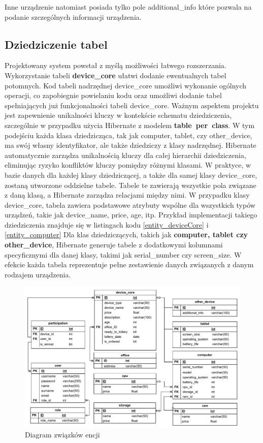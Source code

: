 Inne urządzenie natomiast posiada tylko pole additional\_info które pozwala na podanie szczególnych informacji urządzenia.

\subsection{Dziedziczenie tabel}
\label{dzedziczenie_hibernate:label}
Projektowany system powstał z myślą możliwości łatwego rozszerzania. Wykorzystanie tabeli \textbf{device\_core} ułatwi dodanie ewentualnych tabel potomnych. Kod tabeli nadrzędnej device\_core umożliwi wykonanie ogólnych operacji, co zapobiegnie powielaniu kodu oraz umożliwi dodanie tabel spełniających już funkcjonalności tabeli device\_core. Ważnym aspektem projektu jest zapewnienie unikalności kluczy w kontekście schematu dziedziczenia, szczególnie w przypadku użycia Hibernate z modelem \textbf{table~per~class}. W tym podejściu każda klasa dziedzicząca, tak jak computer, tablet, czy other\_device, ma swój własny identyfikator, ale także dziedziczy z klasy nadrzędnej. Hibernate automatycznie zarządza unikalnością kluczy dla całej hierarchii dziedziczenia, eliminując ryzyko konfliktów kluczy pomiędzy różnymi klasami. W praktyce, w bazie danych dla każdej klasy dziedziczącej, a także dla samej klasy device\_core, zostaną utworzone oddzielne tabele. Tabele te zawierają wszystkie pola związane z daną klasą, a Hibernate zarządza relacjami między nimi. W przypadku klasy device\_core, tabela zawiera podstawowe atrybuty wspólne dla wszystkich typów urządzeń, takie jak device\_name, price, age, itp. Przykład implementacji takiego dziedziczenia znajduje się w listingach kodu \ref{entity_deviceCore} i \ref{entity_computer}
\newline
Dla klas dziedziczących, takich jak \textbf{computer, tablet czy other\_device}, Hibernate generuje tabele z dodatkowymi kolumnami specyficznymi dla danej klasy, takimi jak serial\_number czy screen\_size. W efekcie każda tabela reprezentuje pełne zestawienie danych związanych z danym rodzajem urządzenia.


\begin{figure}[h]
    \includegraphics[width=\linewidth]{rys04/ER_Diagram.pdf}
    \caption{Diagram związków encji}
    \label{ErDiagram_etykieta}
\end{figure}

